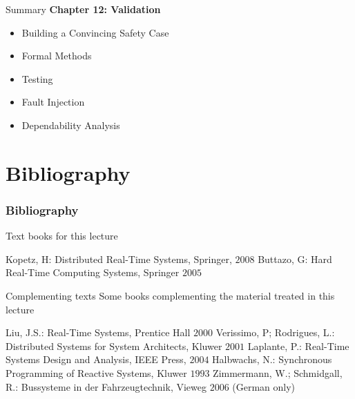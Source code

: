 \begin{frame}{Summary}
\textbf{Chapter 12: Validation}
\begin{itemize}
\item Building a Convincing Safety Case
\item Formal Methods
\item Testing
\item Fault Injection
\item Dependability Analysis
\end{itemize}
\end{frame}


\section{Bibliography}

\begin{frame}
    \frametitle{Bibliography}
\tiny
	Text books for this lecture\\
\vspace*{1ex}

  \begin{thebibliography}{9}

  \beamertemplatearticlebibitems

    Kopetz, H: Distributed Real-Time Systems, Springer, $2008$
    Buttazo, G: Hard Real-Time Computing Systems, Springer $2005$
  \end{thebibliography}

\vspace*{2ex}
Complementing texts
Some books complementing the material treated in this lecture

\vspace*{1ex}

  \begin{thebibliography}{9}
  \beamertemplatearticlebibitems

Liu, J.S.:	Real-Time Systems, Prentice Hall $2000$
Verissimo, P; Rodrigues, L.: 	Distributed Systems for System Architects,
Kluwer $2001$
Laplante, P.:	Real-Time Systems Design and Analysis, IEEE Press, $2004$
Halbwachs, N.:	Synchronous Programming of Reactive Systems, Kluwer $1993$
Zimmermann, W.; Schmidgall, R.:	Bussysteme in der Fahrzeugtechnik, Vieweg
$2006$ (German only)

  \end{thebibliography}


\end{frame}
